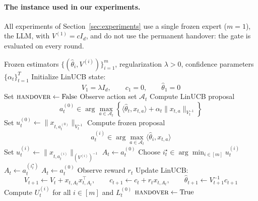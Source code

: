\documentclass{article}
\theoremstyle{definition}
\theoremstyle{remark}
\theoremstyle{remark}
\begin{document}
\paragraph{The instance used in our experiments.}
All experiments of Section~\ref{sec:experiments} use a single frozen expert
($m=1$), the LLM, with $V^{(1)}=cI_d$, and do not use the permanent handover:
the gate is evaluated on every round.

\begin{algorithm}[t]
\caption{Confidence-Gated Master over Frozen Policies and LinUCB}
\label{alg:confidence-gated}
\begin{algorithmic}[1]
\Require Frozen estimators $\{(\widehat{\theta}_i,V^{(i)})\}_{i=1}^m$, regularization $\lambda>0$, confidence parameters $\{\alpha_t\}_{t=1}^T$
\State Initialize LinUCB state:
\[
V_1=\lambda I_d,\qquad c_1=0,\qquad \widehat{\theta}_1=0
\]
\State Set $\textsc{handover}\gets \mathrm{False}$
    \State Observe action set $\mathcal{A}_t$
    \State Compute LinUCB proposal
    \[
    a_t^{(0)} \in \arg\max_{a\in\mathcal{A}_t}
    \left\{
    \langle \widehat{\theta}_t,x_{t,a}\rangle
    + \alpha_t \|x_{t,a}\|_{V_t^{-1}}
    \right\}
    \]
    \State Set $u_t^{(0)} \gets \|x_{t,a_t^{(0)}}\|_{V_t^{-1}}$
        \State Compute frozen proposal
        \[
        a_t^{(i)} \in \arg\max_{a\in\mathcal{A}_t}
        \langle \widehat{\theta}_i,x_{t,a}\rangle
        \]
        \State Set $u_t^{(i)} \gets \|x_{t,a_t^{(i)}}\|_{(V^{(i)})^{-1}}$
    \EndFor
        \State $A_t \gets a_t^{(0)}$
    \Else
        \State Choose $i_t^\star \in \arg\min_{i\in[m]} u_t^{(i)}$
            \State $A_t \gets a_t^{(i_t^\star)}$
        \Else
            \State $A_t \gets a_t^{(0)}$
        \EndIf
    \EndIf
    \State Observe reward $r_t$
    \State Update LinUCB:
    \[
    V_{t+1}\gets V_t + x_{t,A_t}x_{t,A_t}^\top,
    \qquad
    c_{t+1}\gets c_t + r_t x_{t,A_t},
    \qquad
    \widehat{\theta}_{t+1}\gets V_{t+1}^{-1}c_{t+1}
    \]
    \State Compute $U_t^{(i)}$ for all $i\in[m]$ and $L_t^{(0)}$
        \State $\textsc{handover}\gets \mathrm{True}$
    \EndIf
\EndFor
\end{algorithmic}
\end{algorithm}
\end{document}

